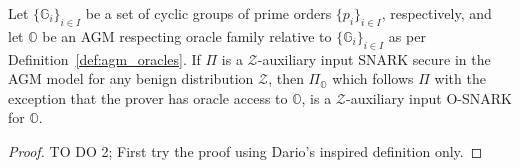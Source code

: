 \begin{comment}
\begin{theorem}[O-SNARKS for AGM Respecting Oracles]
\label{the:when_osnarks} 
Let $\mathbb{G}$ be a cyclic group of prime order $p$ and let $\mathbb{O}$ be an AGM respecting oracle 
relative to $\mathbb{G}$ as per Definition~\ref{def:agm_oracles}. We denote by $\mathcal{Z}_{\mathbb{O}}$ the 
probability distribution of all the public parameters that define a member of $\mathbb{O}$ together with some 
polynomial number $Q$ of queries and answers to $\mathbb{O}$. More formally: 
$\mathcal{Z}_{\mathbb{O}} = (\mathit{pp}, \{\mathcal{O}(q_i), q_i\}_{i=1}^Q)$, 
$Q = \mathsf{poly}(\lambda)$, $(\mathit{pp}, \mathcal{O}) \leftarrow \mathbb{O}$. Then every $\mathcal{Z}_{\mathbb{O}}$-auxiliary 
input SNARK $\Pi$ secure in the AGM model with respect to $\mathbb{G}$ is an O-SNARK for $\mathbb{O}$.
\end{theorem}
\end{comment}

\begin{theorem}
\label{the:when_osnarks} 
Let $\{\mathbb{G}_{i}\}_{i  \in I}$ be a set of cyclic groups of prime orders $\{p_i\}_{i \in I}$, respectively, and let $\mathbb{O}$ be an AGM 
respecting oracle family relative to $\{\mathbb{G}_{i}\}_{i  \in I}$ as per Definition~\ref{def:agm_oracles}.
 If $\Pi$ is a $\mathcal{Z}$-auxiliary input SNARK secure in the AGM model for any benign 
distribution $\mathcal{Z}$, then $\Pi_{\mathbb{O}}$ which follows $\Pi$ with the exception that the prover has oracle access to $\mathbb{O}$, 
is a $\mathcal{Z}$-auxiliary input O-SNARK for $\mathbb{O}$.
\end{theorem}

\begin{proof}{\color{red}TO DO 2; First try the proof using Dario's inspired definition only.}
\begin{comment} Write a proof inspired by We denote by $\mathcal{Z}_{\mathbb{O}}$ the 
probability distribution of all the public parameters that define a member of $\mathbb{O}$ together with some 
polynomial number $Q$ of queries and answers to $\mathbb{O}$. More formally: 
$\mathcal{Z}_{\mathbb{O}} = (\mathit{pp}, \{\mathcal{O}(q_i), q_i\}_{i=1}^Q)$, 
$Q = \mathsf{poly}(\lambda)$, $(\mathit{pp}, \mathcal{O}) \leftarrow \mathbb{O}$. Then every $\mathcal{Z}_{\mathbb{O}}$-auxiliary 
input SNARK $\Pi$ secure in the AGM model with respect to $\mathbb{G}$ is an O-SNARK for $\mathbb{O}$.
\end{comment}
\end{proof}

